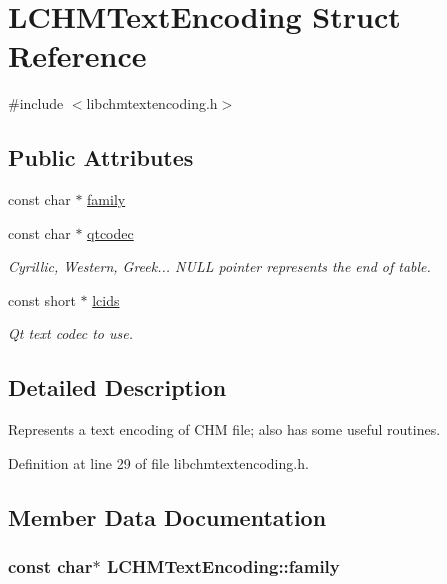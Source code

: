 \hypertarget{structLCHMTextEncoding}{\section{L\+C\+H\+M\+Text\+Encoding Struct Reference}
\label{structLCHMTextEncoding}
}


{\ttfamily \#include $<$libchmtextencoding.\+h$>$}

\subsection*{Public Attributes}
\begin{DoxyCompactItemize}
\item 
const char $\ast$ \hyperlink{structLCHMTextEncoding_a3c0d7c55bb69d4dbdb1ae512a5c42225}{family}
\item 
const char $\ast$ \hyperlink{structLCHMTextEncoding_a568ebc6339c15035490e8d9c0c1f9959}{qtcodec}
\begin{DoxyCompactList}\small\item\em Cyrillic, Western, Greek... N\+U\+L\+L pointer represents the end of table. \end{DoxyCompactList}\item 
const short $\ast$ \hyperlink{structLCHMTextEncoding_afd6331430de9c0ecd180732eb34fabb0}{lcids}
\begin{DoxyCompactList}\small\item\em Qt text codec to use. \end{DoxyCompactList}\end{DoxyCompactItemize}


\subsection{Detailed Description}
Represents a text encoding of C\+H\+M file; also has some useful routines. 

Definition at line 29 of file libchmtextencoding.\+h.



\subsection{Member Data Documentation}
\hypertarget{structLCHMTextEncoding_a3c0d7c55bb69d4dbdb1ae512a5c42225}{
\subsubsection[{family}]{\setlength{\rightskip}{0pt plus 5cm}const char$\ast$ L\+C\+H\+M\+Text\+Encoding\+::family}}\label{structLCHMTextEncoding_a3c0d7c55bb69d4dbdb1ae512a5c42225}


